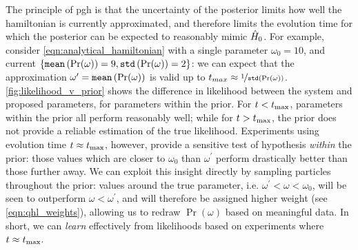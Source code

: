 The principle of \gls{pgh} is that the uncertainty of the posterior limits how well the \gls{hamiltonian} is currently 
approximated\footnotemark, and therefore limits the evolution time for which the posterior can be expected to 
reasonably mimic $\hat{H}_0$.
For example, consider \cref{eqn:analytical_hamiltonian} with a single parameter $\omega_0 = 10$,
and current $\{\texttt{mean}\left(\Pr(\omega)\right) = 9, \texttt{std}\left(\Pr(\omega)\right) = 2\}$:
we can expect that the approximation $\omega^{\prime} = \texttt{mean}\left(\Pr(\omega)\right)$ 
is valid up to $t_{max} \approx \nicefrac{1}{\texttt{std}\left(\Pr(\omega)\right)}$.
\cref{fig:likelihood_v_prior} shows the difference in \gls{likelihood} between the system and 
proposed parameters, for parameters within the prior.
For $t < t_{\rm{max}}$, parameters within the prior all perform reasonably well; 
while for $t > t_{\rm{max}}$, the prior does not provide a reliable estimation of the true likelihood.
Experiments using evolution time $t \approx t_{\rm{max}}$, however, provide a sensitive test of hypothesis 
\emph{within} the prior: 
those values which are closer to $\omega_0$ than $\omega^{\prime}$ perform drastically better than 
those further away. 
We can exploit this insight directly by sampling particles throughout the prior:
values around the true parameter, i.e. $\omega^{\prime} < \omega < \omega_0$,
will be seen to outperform $\omega < \omega^{\prime}$, 
and will therefore be assigned higher weight (see \cref{eqn:qhl_weights}),
allowing us to redraw $\Pr(\omega)$ based on meaningful data.
In short, we can \emph{learn} effectively from likelihoods based on experiments where $t \approx t_{\rm{max}}$. 

